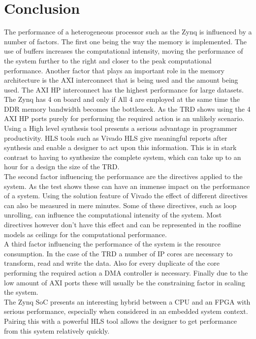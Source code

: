 

\chapter*{Conclusion}

The performance of a heterogeneous processor such as the Zynq is influenced by a number of factors. The first one being the way the memory is implemented. The use of buffers increases the computational intensity, moving the performance of the system further to the right and closer to the peak computational performance. Another factor that plays an important role in the memory architecture is the AXI interconnect that is being used and the amount being used. The AXI HP interconnect has the highest performance for large datasets. The Zynq has 4 on board and only if All 4 are employed at the same time the DDR memory bandwidth becomes the bottleneck. As the TRD shows using the 4 AXI HP ports purely for performing the required action is an unlikely scenario. Using a High level synthesis tool presents a serious advantage in programmer productivity. HLS tools such as Vivado HLS give meaningful reports after synthesis and enable a designer to act upon this information. This is in stark contrast to having to synthesize the complete system, which can take up to an hour for a design the size of the TRD.\\
The second factor influencing the performance are the directives applied to the system. As the test shows these can have an immense impact on the performance of a system. Using the solution feature of Vivado the effect of different directives can also be measured in mere minutes. Some of these directives, such as loop unrolling, can influence the computational intensity of the system. Most directives however don't have this effect and can be represented in the roofline models as ceilings for the computational performance.\\
A third factor influencing the performance of the system is the resource consumption. In the case of the TRD a number of IP cores are necessary to transform, read and write the data. Also for every duplicate of the core performing the required action a DMA controller is necessary. Finally due to the low amount of AXI ports these will usually be the constraining factor in scaling the system.\\
The Zynq SoC presents an interesting hybrid between a CPU and an FPGA with serious performance, especially when considered in an embedded system context. Pairing this with a powerful HLS tool allows the designer to get performance from this system relatively quickly.